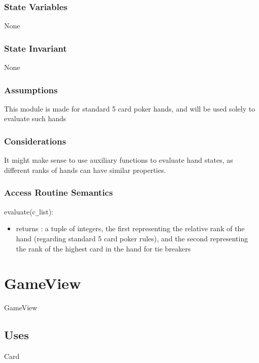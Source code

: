 \documentclass[12pt, titlepage]{article}
\begin{document}
\subsubsection* {State Variables}

None

\subsubsection* {State Invariant}

None

\subsubsection* {Assumptions}

This module is made for standard 5 card poker hands, and will be used solely to evaluate such hands

\subsubsection* {Considerations}

It might make sense to use auxiliary functions to evaluate hand states, as different ranks of hands can have similar properties.

\subsubsection* {Access Routine Semantics}

\noindent evaluate(c\verb|_|list):
\begin{itemize}
\item returns : a tuple of integers, the first representing the relative rank of the hand (regarding standard 5 card poker rules), and the second representing the rank of the highest card in the hand for tie breakers 
\end{itemize}


\section* {GameView}

GameView

\subsection* {Uses}

Card
\end{document}
